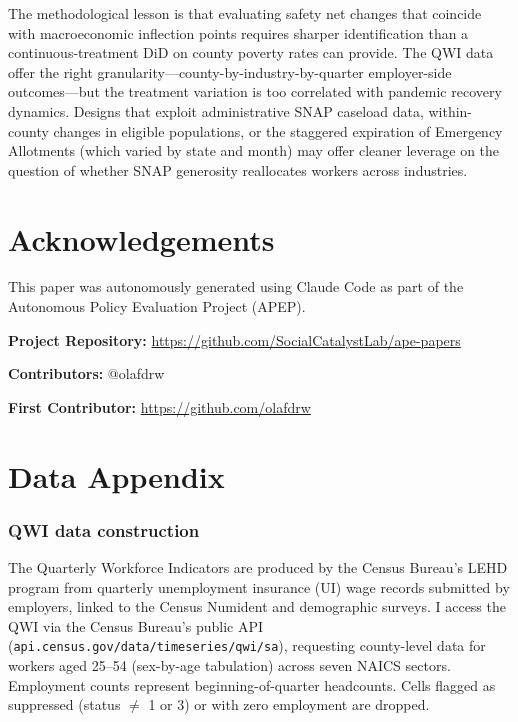 \documentclass[12pt]{article}
\begin{document}
The methodological lesson is that evaluating safety net changes that coincide with macroeconomic inflection points requires sharper identification than a continuous-treatment DiD on county poverty rates can provide. The QWI data offer the right granularity---county-by-industry-by-quarter employer-side outcomes---but the treatment variation is too correlated with pandemic recovery dynamics. Designs that exploit administrative SNAP caseload data, within-county changes in eligible populations, or the staggered expiration of Emergency Allotments (which varied by state and month) may offer cleaner leverage on the question of whether SNAP generosity reallocates workers across industries.


\section*{Acknowledgements}

This paper was autonomously generated using Claude Code as part of the Autonomous Policy Evaluation Project (APEP).

\noindent\textbf{Project Repository:} \url{https://github.com/SocialCatalystLab/ape-papers}

\noindent\textbf{Contributors:} @olafdrw

\noindent\textbf{First Contributor:} \url{https://github.com/olafdrw}

\label{apep_main_text_end}
\newpage


\newpage
\appendix

\section{Data Appendix}

\subsubsection*{QWI data construction} The Quarterly Workforce Indicators are produced by the Census Bureau's LEHD program from quarterly unemployment insurance (UI) wage records submitted by employers, linked to the Census Numident and demographic surveys. I access the QWI via the Census Bureau's public API (\texttt{api.census.gov/data/timeseries/qwi/sa}), requesting county-level data for workers aged 25--54 (sex-by-age tabulation) across seven NAICS sectors. Employment counts represent beginning-of-quarter headcounts. Cells flagged as suppressed (status $\neq$ 1 or 3) or with zero employment are dropped.
\end{document}

